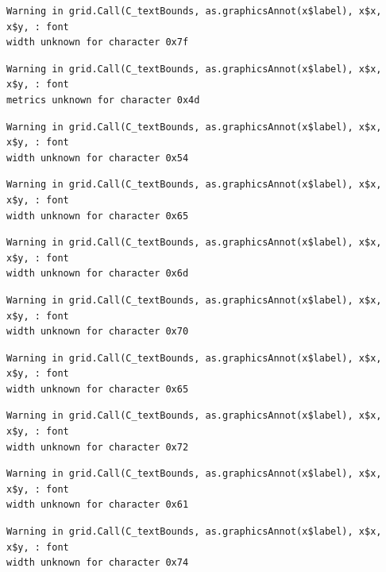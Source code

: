 \documentclass[
  letterpaper,
  DIV=11,
  numbers=noendperiod]{scrreprt}
\begin{document}
\begin{verbatim}
Warning in grid.Call(C_textBounds, as.graphicsAnnot(x$label), x$x, x$y, : font
width unknown for character 0x7f
\end{verbatim}

\begin{verbatim}
Warning in grid.Call(C_textBounds, as.graphicsAnnot(x$label), x$x, x$y, : font
metrics unknown for character 0x4d
\end{verbatim}

\begin{verbatim}
Warning in grid.Call(C_textBounds, as.graphicsAnnot(x$label), x$x, x$y, : font
width unknown for character 0x54
\end{verbatim}

\begin{verbatim}
Warning in grid.Call(C_textBounds, as.graphicsAnnot(x$label), x$x, x$y, : font
width unknown for character 0x65
\end{verbatim}

\begin{verbatim}
Warning in grid.Call(C_textBounds, as.graphicsAnnot(x$label), x$x, x$y, : font
width unknown for character 0x6d
\end{verbatim}

\begin{verbatim}
Warning in grid.Call(C_textBounds, as.graphicsAnnot(x$label), x$x, x$y, : font
width unknown for character 0x70
\end{verbatim}

\begin{verbatim}
Warning in grid.Call(C_textBounds, as.graphicsAnnot(x$label), x$x, x$y, : font
width unknown for character 0x65
\end{verbatim}

\begin{verbatim}
Warning in grid.Call(C_textBounds, as.graphicsAnnot(x$label), x$x, x$y, : font
width unknown for character 0x72
\end{verbatim}

\begin{verbatim}
Warning in grid.Call(C_textBounds, as.graphicsAnnot(x$label), x$x, x$y, : font
width unknown for character 0x61
\end{verbatim}

\begin{verbatim}
Warning in grid.Call(C_textBounds, as.graphicsAnnot(x$label), x$x, x$y, : font
width unknown for character 0x74
\end{verbatim}
\end{document}
